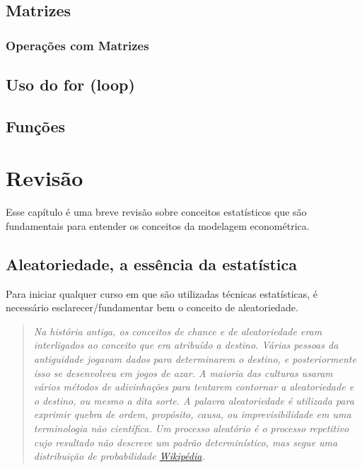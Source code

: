 \documentclass[
]{book}
\theoremstyle{definition}
\theoremstyle{definition}
\theoremstyle{definition}
\theoremstyle{remark}
\begin{document}
\hypertarget{matrizes}{%
\section{Matrizes}\label{matrizes}}

\hypertarget{operauxe7uxf5es-com-matrizes}{%
\subsection{Operações com Matrizes}\label{operauxe7uxf5es-com-matrizes}}

\hypertarget{uso-do-for-loop}{%
\section{Uso do for (loop)}\label{uso-do-for-loop}}

\hypertarget{funuxe7uxf5es}{%
\section{Funções}\label{funuxe7uxf5es}}

\hypertarget{rev}{%
\chapter{Revisão}\label{rev}}

Esse capítulo é uma breve revisão sobre conceitos estatísticos que são fundamentais para entender os conceitos da modelagem econométrica.

\hypertarget{aleatoriedade-a-essuxeancia-da-estatuxedstica}{%
\section{Aleatoriedade, a essência da estatística}\label{aleatoriedade-a-essuxeancia-da-estatuxedstica}}

Para iniciar qualquer curso em que são utilizadas técnicas estatísticas, é necessário
esclarecer/fundamentar bem o conceito de aleatoriedade.

\begin{quote}
\emph{Na história antiga, os conceitos de chance e de aleatoriedade eram interligados ao conceito que era atribuído a destino. Várias pessoas da antiguidade jogavam dados para determinarem o destino, e posteriormente isso se desenvolveu em jogos de azar. A maioria das culturas usaram vários métodos de adivinhações para tentarem contornar a aleatoriedade e o destino, ou mesmo a dita sorte. A palavra aleatoriedade é utilizada para exprimir quebra de ordem, propósito, causa, ou imprevisibilidade em uma terminologia não científica. Um processo aleatório é o processo repetitivo cujo resultado não descreve um padrão determinístico, mas segue uma distribuição de probabilidade \href{https://pt.wikipedia.org/wiki/Aleatoriedade}{Wikipédia}.}
\end{quote}
\end{document}
